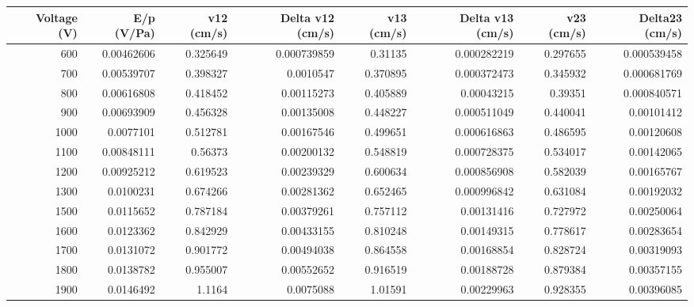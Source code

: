 \begin{tabular}{rrrrrrrr}
\hline
   Voltage (V) &   E/p (V/Pa) &   v12 (cm/s) &   Delta v12 (cm/s) &   v13 (cm/s) &   Delta v13 (cm/s) &   v23 (cm/s) &   Delta23 (cm/s) \\
\hline
           600 &               0.00462606 &     0.325649 &        0.000739859 &     0.31135  &        0.000282219 &     0.297655 &      0.000539458 \\
           700 &               0.00539707 &     0.398327 &        0.0010547   &     0.370895 &        0.000372473 &     0.345932 &      0.000681769 \\
           800 &               0.00616808 &     0.418452 &        0.00115273  &     0.405889 &        0.00043215  &     0.39351  &      0.000840571 \\
           900 &               0.00693909 &     0.456328 &        0.00135008  &     0.448227 &        0.000511049 &     0.440041 &      0.00101412  \\
          1000 &               0.0077101  &     0.512781 &        0.00167546  &     0.499651 &        0.000616863 &     0.486595 &      0.00120608  \\
          1100 &               0.00848111 &     0.56373  &        0.00200132  &     0.548819 &        0.000728375 &     0.534017 &      0.00142065  \\
          1200 &               0.00925212 &     0.619523 &        0.00239329  &     0.600634 &        0.000856908 &     0.582039 &      0.00165767  \\
          1300 &               0.0100231  &     0.674266 &        0.00281362  &     0.652465 &        0.000996842 &     0.631084 &      0.00192032  \\
          1500 &               0.0115652  &     0.787184 &        0.00379261  &     0.757112 &        0.00131416  &     0.727972 &      0.00250064  \\
          1600 &               0.0123362  &     0.842929 &        0.00433155  &     0.810248 &        0.00149315  &     0.778617 &      0.00283654  \\
          1700 &               0.0131072  &     0.901772 &        0.00494038  &     0.864558 &        0.00168854  &     0.828724 &      0.00319093  \\
          1800 &               0.0138782  &     0.955007 &        0.00552652  &     0.916519 &        0.00188728  &     0.879384 &      0.00357155  \\
          1900 &               0.0146492  &     1.1164   &        0.0075088   &     1.01591  &        0.00229963  &     0.928355 &      0.00396085  \\

\end{tabular}
